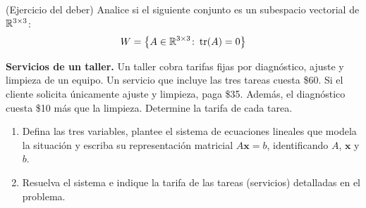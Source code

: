 \documentclass[10pt,a4]{examenEPN0}
\begin{document}
\begin{preguntas}
\vspace*{30\baselineskip}
\item (Ejercicio del deber) Analice si el siguiente conjunto es un subespacio vectorial de $\mathbb{R}^{3 \times 3}$:
    \[
    W = \left\{ A \in \mathbb{R}^{3 \times 3} \colon \operatorname{tr}(A) = 0 \right\}
    \] 
\newpage

\item \textbf{Servicios de un taller.} Un taller cobra tarifas fijas por diagnóstico, ajuste y limpieza de un equipo. Un servicio que incluye las tres tareas cuesta \$60. Si el cliente solicita únicamente ajuste y limpieza, paga \$35. Además, el diagnóstico cuesta \$10 más que la limpieza. Determine la tarifa de cada tarea.

\begin{enumerate}
    \item Defina las tres variables, plantee el sistema de ecuaciones lineales que modela la situación y escriba su representación matricial $A\mathbf{x}=b$, identificando $A$, $\mathbf{x}$ y $b$.
    \item Resuelva el sistema e indique la tarifa de las tareas (servicios) detalladas en el problema. 
\end{enumerate}

   

\end{preguntas}
\end{document}
